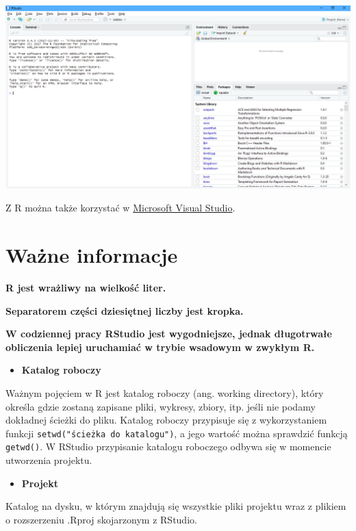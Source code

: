 \documentclass[
]{book}
\providecommand{\tightlist}{%
  \setlength{\itemsep}{0pt}\setlength{\parskip}{0pt}}
\begin{document}
\includegraphics{img/rstudio.png}

Z R można także korzystać w \href{https://www.visualstudio.com/pl/vs/rtvs/}{Microsoft Visual Studio}.

\hypertarget{waux17cne-informacje}{%
\section{Ważne informacje}\label{waux17cne-informacje}}

\textbf{R jest wrażliwy na wielkość liter.}

\textbf{Separatorem części dziesiętnej liczby jest kropka.}

\textbf{W codziennej pracy RStudio jest wygodniejsze, jednak długotrwałe obliczenia lepiej uruchamiać w trybie wsadowym w zwykłym R.}

\begin{itemize}
\tightlist
\item
  \textbf{Katalog roboczy}
\end{itemize}

Ważnym pojęciem w R jest katalog roboczy (ang. working directory), który określa gdzie zostaną zapisane pliki, wykresy, zbiory, itp. jeśli nie podamy dokładnej ścieżki do pliku. Katalog roboczy przypisuje się z wykorzystaniem funkcji \texttt{setwd("ścieżka\ do\ katalogu")}, a jego wartość można sprawdzić funkcją \texttt{getwd()}. W RStudio przypisanie katalogu roboczego odbywa się w momencie utworzenia projektu.

\begin{itemize}
\tightlist
\item
  \textbf{Projekt}
\end{itemize}

Katalog na dysku, w którym znajdują się wszystkie pliki projektu wraz z plikiem o rozszerzeniu .Rproj skojarzonym z RStudio.
\end{document}
